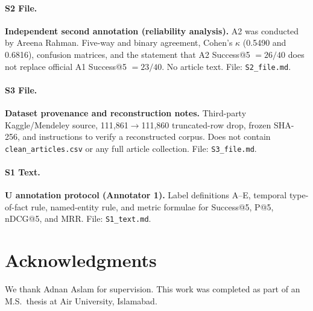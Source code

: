 \documentclass[10pt,letterpaper]{article}
\begin{document}
\paragraph*{S2 File.}
\label{S2_File}
\textbf{Independent second annotation (reliability analysis).} A2 was conducted by Areena Rahman. Five-way and binary agreement, Cohen's $\kappa$ (0.5490 and 0.6816), confusion matrices, and the statement that A2 Success@5 $= 26/40$ does not replace official A1 Success@5 $= 23/40$. No article text. File: \texttt{S2\_file.md}.

\paragraph*{S3 File.}
\label{S3_File}
\textbf{Dataset provenance and reconstruction notes.} Third-party Kaggle/Mendeley source, 111,861$\to$111,860 truncated-row drop, frozen SHA-256, and instructions to verify a reconstructed corpus. Does not contain \texttt{clean\_articles.csv} or any full article collection. File: \texttt{S3\_file.md}.

\paragraph*{S1 Text.}
\label{S1_Text}
\textbf{U annotation protocol (Annotator 1).} Label definitions A--E, temporal type-of-fact rule, named-entity rule, and metric formulae for Success@5, P@5, nDCG@5, and MRR. File: \texttt{S1\_text.md}.

\section*{Acknowledgments}

We thank Adnan Aslam for supervision. This work was completed as part of an M.S.\ thesis at Air University, Islamabad.

\nolinenumbers



\end{document}
